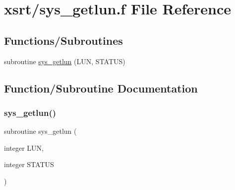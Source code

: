 \hypertarget{xsrt_2sys__getlun_8f}{}\section{xsrt/sys\+\_\+getlun.f File Reference}
\label{xsrt_2sys__getlun_8f}
\subsection*{Functions/\+Subroutines}
\begin{DoxyCompactItemize}
\item 
subroutine \hyperlink{xsrt_2sys__getlun_8f_aa6de0ee0eb7b66980dc5c8376257dfea}{sys\+\_\+getlun} (L\+UN, S\+T\+A\+T\+US)
\end{DoxyCompactItemize}


\subsection{Function/\+Subroutine Documentation}
\mbox{\label{xsrt_2sys__getlun_8f_aa6de0ee0eb7b66980dc5c8376257dfea}} 
\subsubsection{\texorpdfstring{sys\+\_\+getlun()}{sys\_getlun()}}
{\footnotesize\ttfamily subroutine sys\+\_\+getlun (\begin{DoxyParamCaption}\item[{integer}]{L\+UN,  }\item[{integer}]{S\+T\+A\+T\+US }\end{DoxyParamCaption})}

